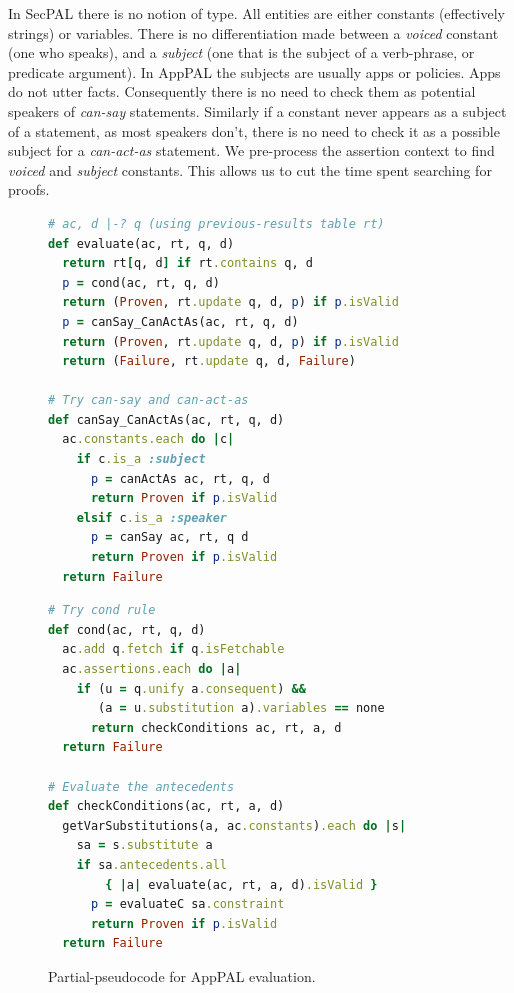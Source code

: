 \documentclass[a4paper]{scrartcl}
\begin{document}
In SecPAL there is no notion of type.
All entities are either constants (effectively strings) or variables.
There is no differentiation made between a \emph{voiced} constant (one who speaks),
and a \emph{subject} (one that is the subject of a verb-phrase, or predicate argument).
In AppPAL the subjects are usually apps or policies.
Apps do not utter facts.
Consequently there is no need to check them as potential speakers of \emph{can-say} statements.
Similarly if a constant never appears as a subject of a statement, as most speakers don't,
  there is no need to check it as a possible subject for a \emph{can-act-as} statement.
We pre-process the assertion context to find \emph{voiced} and \emph{subject} constants.
This allows us to cut the time spent searching for proofs.


\begin{figure}
\begin{minipage}[b]{0.5\linewidth}
\begin{lstlisting}[language=Ruby, basicstyle=\ttfamily\scriptsize, keywordstyle=\scriptsize\slshape, columns=flexible]
# ac, d |-? q (using previous-results table rt)
def evaluate(ac, rt, q, d)
  return rt[q, d] if rt.contains q, d
  p = cond(ac, rt, q, d)
  return (Proven, rt.update q, d, p) if p.isValid 
  p = canSay_CanActAs(ac, rt, q, d)
  return (Proven, rt.update q, d, p) if p.isValid 
  return (Failure, rt.update q, d, Failure)

# Try can-say and can-act-as
def canSay_CanActAs(ac, rt, q, d)
  ac.constants.each do |c| 
    if c.is_a :subject
      p = canActAs ac, rt, q, d
      return Proven if p.isValid
    elsif c.is_a :speaker
      p = canSay ac, rt, q d
      return Proven if p.isValid
  return Failure
\end{lstlisting}
\end{minipage}
\begin{minipage}[b]{0.5\linewidth}
\begin{lstlisting}[language=Ruby, basicstyle=\ttfamily\scriptsize, keywordstyle=\scriptsize\slshape, columns=flexible]
# Try cond rule
def cond(ac, rt, q, d)
  ac.add q.fetch if q.isFetchable
  ac.assertions.each do |a|
    if (u = q.unify a.consequent) &&
       (a = u.substitution a).variables == none
      return checkConditions ac, rt, a, d
  return Failure
    
# Evaluate the antecedents
def checkConditions(ac, rt, a, d)
  getVarSubstitutions(a, ac.constants).each do |s|
    sa = s.substitute a
    if sa.antecedents.all 
        { |a| evaluate(ac, rt, a, d).isValid }
      p = evaluateC sa.constraint
      return Proven if p.isValid
  return Failure
\end{lstlisting}
\end{minipage}
\caption{Partial-pseudocode for AppPAL evaluation.}
\label{fig:pseudocode}
\end{figure}
\end{document}
